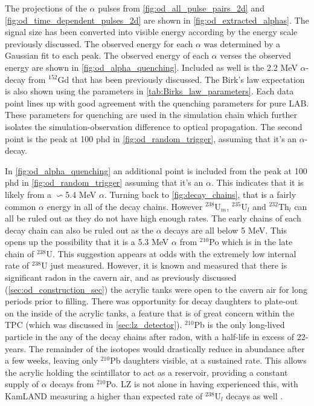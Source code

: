 \par
The projections of the $\alpha$ pulses from \autoref{fig:od_all_pulse_pairs_2d} and \autoref{fig:od_time_dependent_pulses_2d} are shown in \autoref{fig:od_extracted_alphas}.
The signal size has been converted into visible energy according by the energy scale previously discussed.
The observed energy for each $\alpha$ was determined by a Gaussian fit to each peak.
The observed energy of each $\alpha$ verses the observed energy are shown in \autoref{fig:od_alpha_quenching}.
Included as well is the 2.2 MeV $\alpha$-decay from ${}^{152}$Gd that has been previously discussed.
The Birk's law expectation is also shown using the parameters in \autoref{tab:Birks_law_parameters}.
Each data point lines up with good agreement with the quenching parameters for pure LAB.
These parameters for quenching are used in the simulation chain which further isolates the simulation-observation difference to optical propagation.
The second point is the peak at 100 phd in \autoref{fig:od_random_trigger}, assuming that it's an $\alpha$-decay.
\par
In \autoref{fig:od_alpha_quenching} an additional point is included from the peak at 100 phd in \autoref{fig:od_random_trigger} assuming that it's an $\alpha$.
This indicates that it is likely from a $\backsim$5.4 MeV $\alpha$.
Turning back to \autoref{fig:decay_chains}, that is a fairly common $\alpha$ energy in all of the decay chains.
However ${}^{238}$U$_{m}$, ${}^{235}$U$_{l}$ and ${}^{232}$Th$_{l}$ can all be ruled out as they do not have high enough rates.
The early chains of each decay chain can also be ruled out as the $\alpha$ decays are all below 5 MeV.
This opens up the possibility that it is a 5.3 MeV $\alpha$ from ${}^{210}$Po which is in the late chain of ${}^{238}$U.
This suggestion appears at odds with the extremely low internal rate of ${}^{238}$U just measured.
However, it is known and measured that there is significant radon in the cavern air, and as previously discussed (\autoref{sec:od_construction_sec}) the acrylic tanks were open to the cavern air for long periods prior to filling.
There was opportunity for decay daughters to plate-out on the inside of the acrylic tanks, a feature that is of great concern within the TPC \cite{radon_plateout_ref} (which was discussed in \autoref{sec:lz_detector}).
${}^{210}$Pb is the only long-lived particle in the any of the decay chains after radon, with a half-life in excess of 22-years. 
The remainder of the isotopes would drastically reduce in abundance after a few weeks, leaving only ${}^{210}$Pb daughters visible, at a sustained rate.
This allows the acrylic holding the scintillator to act as a reservoir, providing a constant supply of $\alpha$ decays from ${}^{210}$Po.
LZ is not alone in having experienced this, with KamLAND measuring a higher than expected rate of ${}^{238}$U$_l$ decays as well \cite{KamLAND_LS_contaminants_ref}.

